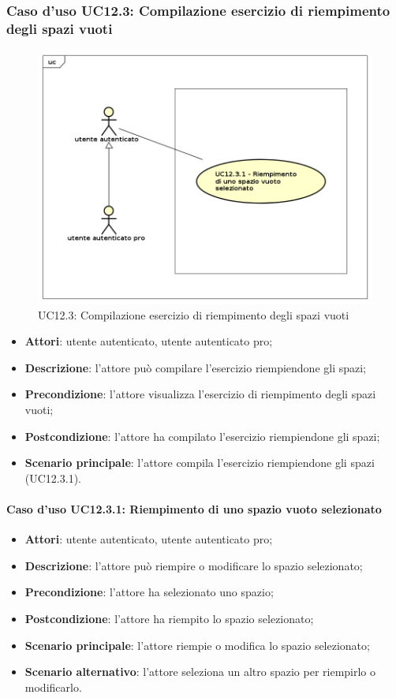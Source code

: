 \subsubsection{Caso d'uso UC12.3: Compilazione esercizio di riempimento degli spazi vuoti}
\begin{figure}[h]
	\centering
	\includegraphics[scale=0.5]{UML/UC12_3.png}
	\caption{UC12.3: Compilazione esercizio di riempimento degli spazi vuoti}
\end{figure}
\begin{itemize}
\item \textbf{Attori}: utente autenticato, utente autenticato pro;
\item \textbf{Descrizione}: l'attore può compilare l'esercizio riempiendone gli spazi;
\item \textbf{Precondizione}: l'attore visualizza l'esercizio di riempimento degli spazi vuoti;
\item \textbf{Postcondizione}: l'attore ha compilato l'esercizio riempiendone gli spazi;
\item \textbf{Scenario principale}: l'attore compila l'esercizio riempiendone gli spazi  (UC12.3.1).
\end{itemize}

\paragraph{Caso d'uso UC12.3.1: Riempimento di uno spazio vuoto selezionato}
\begin{itemize}
\item \textbf{Attori}: utente autenticato, utente autenticato pro;
\item \textbf{Descrizione}: l'attore può riempire o modificare lo spazio selezionato;
\item \textbf{Precondizione}: l'attore ha selezionato uno spazio;
\item \textbf{Postcondizione}: l'attore ha riempito lo spazio selezionato;
\item \textbf{Scenario principale}: l'attore riempie o modifica lo spazio selezionato;
\item \textbf{Scenario alternativo}: l'attore seleziona un altro spazio per riempirlo o modificarlo. 
\end{itemize}

